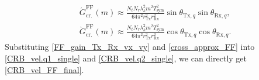 \documentclass[9pt,final,journal,twocolumn]{IEEEtran}
\begin{document}
\begin{subequations} \label{cross_approx_FF}
\begin{align} 
&\acute{G}_{\mathrm{cr.}}^{\mathrm{FF}}(m) \approx \frac{N_t N_r \lambda_k^{2} m^{2} T_{\mathrm{sym}}^{2}}
{64 \pi^{2} r_{\mathrm{Tx}}^{2} r_{\mathrm{Rx}}^{2}}
\sin\theta_{\mathrm{Tx},q}\sin\theta_{\mathrm{Rx},q},\\
& \grave{G}_{\mathrm{cr.}}^{\mathrm{FF}}(m) \approx \frac{N_t N_r \lambda_k^{2} m^{2} T_{\mathrm{sym}}^{2}}
{64 \pi^{2} r_{\mathrm{Tx}}^{2} r_{\mathrm{Rx}}^{2}}
\cos\theta_{\mathrm{Tx},q}\cos\theta_{\mathrm{Rx},q}.
\end{align}
\end{subequations}
Substituting \eqref{FF_gain_Tx_Rx_vx_vy} and \eqref{cross_approx_FF} into \eqref{CRB_vel.q1_single} and \eqref{CRB_vel.q2_single}, we can directly get 
\eqref{CRB_vel_FF_final}.
\end{document}
